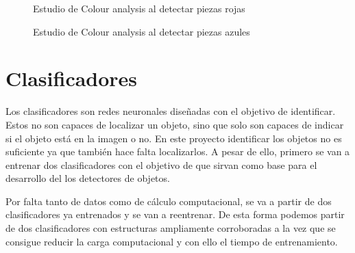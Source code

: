 \begin{figure}[ht]  %
  \hfill	
\caption{Estudio de Colour analysis al detectar piezas rojas}
\label{fig:red colour}
\vspace{-5pt}
\end{figure}

\begin{figure}[ht]  %
  \hfill	
\caption{Estudio de Colour analysis al detectar piezas azules}
\label{fig:blue colour}
\vspace{-5pt}
\end{figure}

\newpage
\section{Clasificadores}
Los clasificadores son redes neuronales diseñadas con el objetivo de identificar. Estos no son capaces de localizar un objeto, sino que solo son capaces de indicar si el objeto está en la imagen o no. En este proyecto identificar los objetos no es suficiente ya que también hace falta localizarlos. A pesar de ello, primero se van a entrenar dos clasificadores con el objetivo de que sirvan como base para el desarrollo del los detectores de objetos.

Por falta tanto de datos como de cálculo computacional, se va a partir de dos clasificadores ya entrenados y se van a reentrenar. De esta forma podemos partir de dos clasificadores con estructuras ampliamente corroboradas a la vez que se consigue reducir la carga computacional y con ello el tiempo de entrenamiento.


